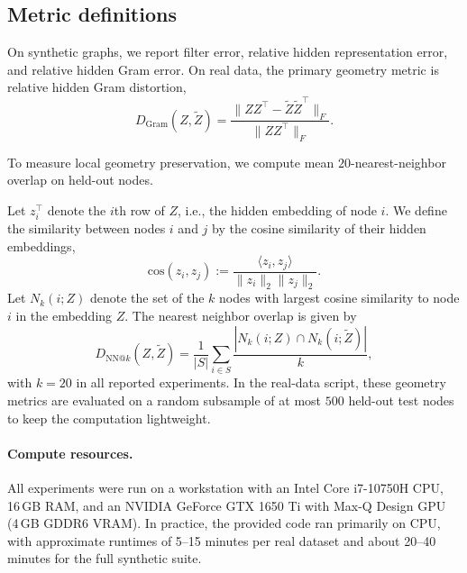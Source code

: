\documentclass{article}
\begin{document}
\subsection{Metric definitions}
\label{app:metrics}

On synthetic graphs, we report filter error, relative hidden representation error, and relative hidden Gram error. On real data, the primary geometry metric is relative hidden Gram distortion,
\begin{equation}
D_{\mathrm{Gram}}(Z,\widetilde Z)
=
\frac{\|ZZ^\top-\widetilde Z\widetilde Z^\top\|_F}
{\|ZZ^\top\|_F}.
\end{equation}

To measure local geometry preservation, we compute mean $20$-nearest-neighbor overlap on held-out nodes. 

Let $z_i^\top$ denote the $i$th row of $Z$, i.e., the hidden embedding of node $i$. We define the similarity between nodes $i$ and $j$ by the cosine similarity of their hidden embeddings,
\[
\mathrm{cos}(z_i,z_j) := \frac{\langle z_i,z_j\rangle}{\|z_i\|_2\|z_j\|_2}.
\]
Let $N_k(i;Z)$ denote the set of the $k$ nodes with largest cosine similarity to node $i$ in the embedding $Z$. The nearest neighbor overlap is given by
\begin{equation}
D_{\mathrm{NN}@k}(Z,\widetilde Z)
=
\frac{1}{|S|}
\sum_{i\in S}
\frac{|N_k(i;Z)\cap N_k(i;\widetilde Z)|}{k},
\end{equation}
with $k=20$ in all reported experiments. In the real-data script, these geometry metrics are evaluated on a random subsample of at most $500$ held-out test nodes to keep the computation lightweight. %

\paragraph{Compute resources.}
All experiments were run on a workstation with an Intel Core i7-10750H CPU, 16\,GB RAM, and an NVIDIA GeForce GTX 1650 Ti with Max-Q Design GPU (4\,GB GDDR6 VRAM). In practice, the provided code ran primarily on CPU, with approximate runtimes of 5–15 minutes per real dataset and about 20–40 minutes for the full synthetic suite. 
\end{document}
